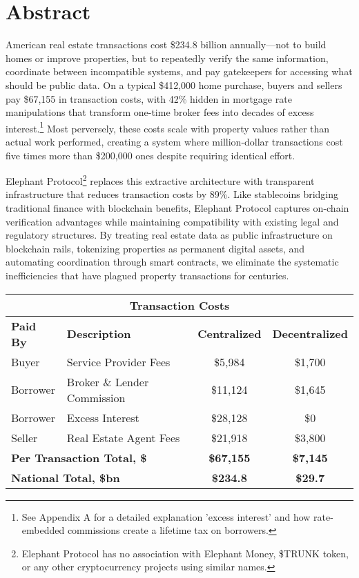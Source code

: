 \chapter{Abstract}

American real estate transactions cost \$234.8 billion annually---not to build homes or improve properties, but to repeatedly verify the same information, coordinate between incompatible systems, and pay gatekeepers for accessing what should be public data. On a typical \$412,000 home purchase, buyers and sellers pay \$67,155 in transaction costs, with 42\% hidden in mortgage rate manipulations that transform one-time broker fees into decades of excess interest.\footnote{See Appendix A for a detailed explanation 'excess interest' and how rate-embedded commissions create a lifetime tax on borrowers.} Most perversely, these costs scale with property values rather than actual work performed, creating a system where million-dollar transactions cost five times more than \$200,000 ones despite requiring identical effort.

Elephant Protocol\footnote{Elephant Protocol has no association with Elephant Money, \$TRUNK token, or any other cryptocurrency projects using similar names.} replaces this extractive architecture with transparent infrastructure that reduces transaction costs by 89\%. Like stablecoins bridging traditional finance with blockchain benefits, Elephant Protocol captures on-chain verification advantages while maintaining compatibility with existing legal and regulatory structures. By treating real estate data as public infrastructure on blockchain rails, tokenizing properties as permanent digital assets, and automating coordination through smart contracts, we eliminate the systematic inefficiencies that have plagued property transactions for centuries.

\begin{center}
\begin{tabular}{llcc}
\hline
\multicolumn{4}{c}{\textbf{Transaction Costs}} \\
\hline
\textbf{Paid By} & \textbf{Description} & \textbf{Centralized} & \textbf{Decentralized} \\
\hline
Buyer & Service Provider Fees & \$5,984 & \$1,700 \\
Borrower & Broker \& Lender Commission & \$11,124 & \$1,645 \\
Borrower & Excess Interest & \$28,128 & \$0 \\
Seller & Real Estate Agent Fees & \$21,918 & \$3,800 \\
\hline
\multicolumn{2}{l}{\textbf{Per Transaction Total, \$}} & \textbf{\$67,155} & \textbf{\$7,145} \\
\multicolumn{2}{l}{\textbf{National Total, \$bn}} & \textbf{\$234.8} & \textbf{\$29.7} \\
\hline
\end{tabular}
\end{center}

